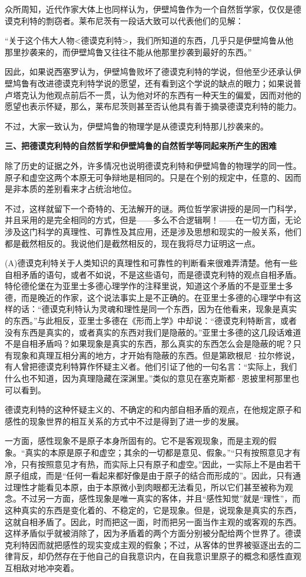 \documentclass[a4paper,twoside,12pt,AutoFakeBold]{ctexart}
\begin{document}
众所周知，近代作家大体上也同样认为，伊壁鸠鲁作为一个自然哲学家，仅仅是德谟克利特的剽窃者。莱布尼茨有一段话大致可以代表他们的见解：

“关于这个伟大人物<德谟克利特>，我们所知道的东西，几乎只是伊壁鸠鲁从他那里抄袭来的，而伊壁鸠鲁又往往不能从他那里抄袭到最好的东西。”

因此，如果说西塞罗认为，伊壁鸠鲁败坏了德谟克利特的学说，但他至少还承认伊壁鸠鲁有改进德谟克利特学说的愿望，还有看到这个学说的缺点的眼力；如果说普卢塔克认为他观点前后不一贯，认为他对坏的东西有一种天生的偏爱，因而对他的愿望也表示怀疑，那么，莱布尼茨则甚至否认他具有善于摘录德谟克利特的能力。

不过，大家一致认为，伊壁鸠鲁的物理学是从德谟克利特那儿抄袭来的。

\textbf{三、把德谟克利特的自然哲学和伊壁鸠鲁的自然哲学等同起来所产生的困难}

除了历史的证据之外，许多情况也说明德谟克利特和伊壁鸠鲁的物理学的同一性。原子和虚空这两个本原无可争辩地是相同的。只是在个别的规定中，任意的、因而是非本质的差别看来才占统治地位。

不过，这样就留下一个奇特的、无法解开的谜。两位哲学家讲授的是同一门科学，并且采用的是完全相同的方式，但是——多么不合逻辑啊！——在一切方面，无论涉及这门科学的真理性、可靠性及其应用，还是涉及思想和现实的一般关系，他们都是截然相反的。我说他们是截然相反的，现在我将尽力证明这一点。

 (A)德谟克利特关于人类知识的真理性和可靠性的判断看来很难弄清楚。他有一些自相矛盾的语句，或者不如说，不是这些语句，而是德谟克利特的观点自相矛盾。特伦德伦堡在为亚里士多德心理学作的注释里说，知道这个矛盾的不是亚里士多德，而是晚近的作家，这个说法事实上是不正确的。在亚里士多德的心理学中有这样的话：“德谟克利特认为灵魂和理性是同一个东西，因为在他看来，现象是真实的东西。”与此相反，亚里士多德在《形而上学》中却说：“德谟克利特断言，或者没有东西是真实的，或者真实的东西对我们是隐蔽的。”亚里士多德的这几段话难道不是自相矛盾吗？如果现象是真实的东西，那么真实的东西怎么会是隐蔽的呢？只有现象和真理互相分离的地方，才开始有隐蔽的东西。但是第欧根尼·拉尔修说，有人曾把德谟克利特算作怀疑主义者。他们引证了他的一句名言：“实际上，我们什么也不知道，因为真理隐藏在深渊里。”类似的意见在塞克斯都·恩披里柯那里也可以看到。

德谟克利特的这种怀疑主义的、不确定的和内部自相矛盾的观点，在他规定原子和感性的现象世界的相互关系的方式中不过是得到了进一步的发展。

一方面，感性现象不是原子本身所固有的。它不是客观现象，而是主观的假象。“真实的本原是原子和虚空；其余的一切都是意见、假象。”“只有按照意见才有冷，只有按照意见才有热，而实际上只有原子和虚空。”因此，一实际上不是由若干原子组成，而是“任何一看起来都好像是由于原子的结合而形成的”。因此，只有通过理性才能看见本原，由于本原微小到肉眼都无法看见，所以它们甚至被称为观念。不过另一方面，感性现象是唯一真实的客体，并且“感性知觉”就是“理性”，而这种真实的东西是变化着的、不稳定的，它是现象。但是，说现象是真实的东西，这就自相矛盾了。因此，时而把这一面，时而把另一面当作主观的或客观的东西。这样矛盾似乎就被消除了，因为矛盾着的两个方面分别被分配给两个世界了。德谟克利特因而就把感性的现实变成主观的假象；不过，从客体的世界被驱逐出去的二律背反，却仍然存在于他自己的自我意识内，在自我意识里原子的概念和感性直观互相敌对地冲突着。
\end{document}
